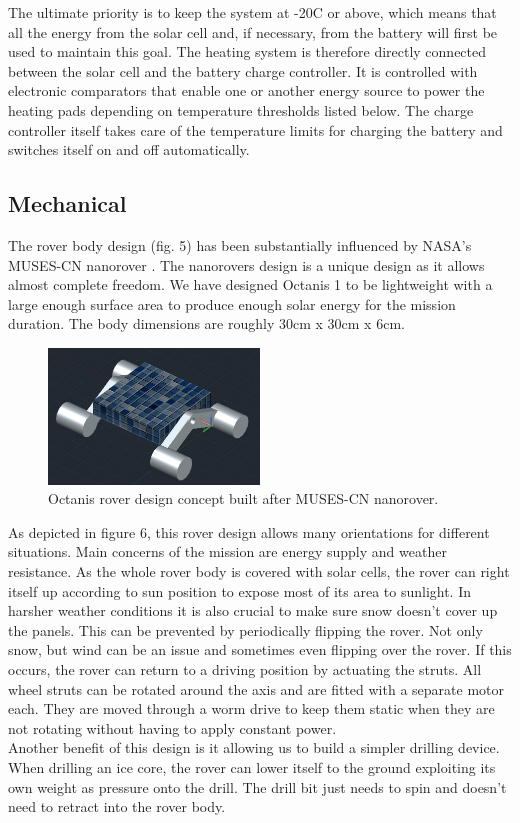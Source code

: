 \documentclass[a4paper,12pt]{article}
\begin{document}
The ultimate priority is to keep the system at -20\degree C or above, which means that all the energy from the solar cell and, if necessary, from the battery will first be used to maintain this goal. The heating system is therefore directly connected between the solar cell and the battery charge controller. It is controlled with electronic comparators that enable one or another energy source to power the heating pads depending on temperature thresholds listed below. The charge controller itself takes care of the temperature limits for charging the battery and switches itself on and off automatically. 


\subsection{Mechanical}
The rover body design (fig. 5) has been substantially influenced by NASA's MUSES-CN nanorover \cite{muses}. The nanorovers design is a unique design as it allows almost complete freedom. We have designed Octanis 1 to be lightweight with a large enough surface area to produce enough solar energy for the mission duration. The body dimensions are roughly 30cm x 30cm x 6cm.

\begin{figure}[h!]
	\centering
    \includegraphics[width=0.5\textwidth]{conceptrover}
    \caption{Octanis rover design concept built after MUSES-CN nanorover.}
\end{figure}

As depicted in figure 6, this rover design allows many orientations for different situations. Main concerns of the mission are energy supply and weather resistance. As the whole rover body is covered with solar cells, the rover can right itself up according to sun position to expose most of its area to sunlight. In harsher weather conditions it is also crucial to make sure snow doesn't cover up the panels. This can be prevented by periodically flipping the rover. Not only snow, but wind can be an issue and sometimes even flipping over the rover. If this occurs, the rover can return to a driving position by actuating the struts. All wheel struts can be rotated around the axis and are fitted with a separate motor each. They are moved through a worm drive to keep them static when they are not rotating without having to apply constant power. \\
Another benefit of this design is it allowing us to build a simpler drilling device. When drilling an ice core, the rover can lower itself to the ground exploiting its own weight as pressure onto the drill. The drill bit just needs to spin and doesn't need to retract into the rover body.
\end{document}
